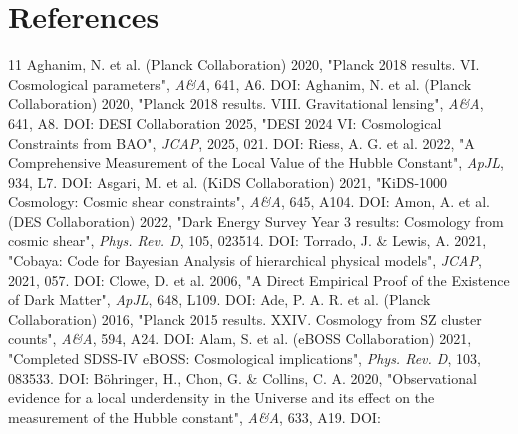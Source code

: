 \documentclass[11pt,a4paper]{article}
\begin{document}
\section{References}
{\scriptsize
\begin{thebibliography}{11}
 Aghanim, N. et al. (Planck Collaboration) 2020, "Planck 2018 results. VI. Cosmological parameters", \emph{A\&A}, 641, A6. DOI: \href{https://doi.org/10.1051/0004-6361/201833910}{{\small\protect{}}}
 Aghanim, N. et al. (Planck Collaboration) 2020, "Planck 2018 results. VIII. Gravitational lensing", \emph{A\&A}, 641, A8. DOI: \href{https://doi.org/10.1051/0004-6361/201833886}{{\small\protect{}}}
 DESI Collaboration 2025, "DESI 2024 VI: Cosmological Constraints from BAO", \emph{JCAP}, 2025, 021. DOI: \href{https://doi.org/10.1088/1475-7516/2025/02/021}{{\small\protect{}}}
 Riess, A. G. et al. 2022, "A Comprehensive Measurement of the Local Value of the Hubble Constant", \emph{ApJL}, 934, L7. DOI: \href{https://doi.org/10.3847/2041-8213/ac5c5b}{{\small\protect{}}}
 Asgari, M. et al. (KiDS Collaboration) 2021, "KiDS-1000 Cosmology: Cosmic shear constraints", \emph{A\&A}, 645, A104. DOI: \href{https://doi.org/10.1051/0004-6361/202039070}{{\small\protect{}}}
 Amon, A. et al. (DES Collaboration) 2022, "Dark Energy Survey Year 3 results: Cosmology from cosmic shear", \emph{Phys. Rev. D}, 105, 023514. DOI: \href{https://doi.org/10.1103/PhysRevD.105.023514}{{\small\protect{}}}
 Torrado, J. \& Lewis, A. 2021, "Cobaya: Code for Bayesian Analysis of hierarchical physical models", \emph{JCAP}, 2021, 057. DOI: \href{https://doi.org/10.1088/1475-7516/2021/05/057}{{\small\protect{}}}
 Clowe, D. et al. 2006, "A Direct Empirical Proof of the Existence of Dark Matter", \emph{ApJL}, 648, L109. DOI: \href{https://doi.org/10.1086/508162}{{\small\protect{}}}
 Ade, P. A. R. et al. (Planck Collaboration) 2016, "Planck 2015 results. XXIV. Cosmology from SZ cluster counts", \emph{A\&A}, 594, A24. DOI: \href{https://doi.org/10.1051/0004-6361/201525833}{{\small\protect{}}}
 Alam, S. et al. (eBOSS Collaboration) 2021, "Completed SDSS-IV eBOSS: Cosmological implications", \emph{Phys. Rev. D}, 103, 083533. DOI: \href{https://doi.org/10.1103/PhysRevD.103.083533}{{\small\protect{}}}
 B\"ohringer, H., Chon, G. \& Collins, C. A. 2020, "Observational evidence for a local underdensity in the Universe and its effect on the measurement of the Hubble constant", \emph{A\&A}, 633, A19. DOI: \href{https://doi.org/10.1051/0004-6361/201936400}{{\small\protect{}}}
\end{thebibliography}
}
\end{document}
